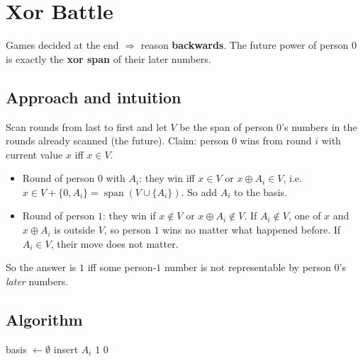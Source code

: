\section{Xor Battle}
\label{sec:b-xor-battle}


\begin{patternbox}
Games decided at the end $\Rightarrow$ reason \textbf{backwards}. The future
power of person $0$ is exactly the \textbf{xor span} of their later numbers.
\end{patternbox}

\subsection*{Approach and intuition}

Scan rounds from last to first and let $V$ be the span of person $0$'s numbers
in the rounds already scanned (the future). Claim: person $0$ wins from round
$i$ with current value $x$ iff $x\in V$.
\begin{itemize}
  \item Round of person $0$ with $A_i$: they win iff $x\in V$ or
        $x\oplus A_i\in V$, i.e.\ $x\in V+\{0,A_i\}=\operatorname{span}(V\cup\{A_i\})$.
        So add $A_i$ to the basis.
  \item Round of person $1$: they win if $x\notin V$ or $x\oplus A_i\notin V$.
        If $A_i\notin V$, one of $x$ and $x\oplus A_i$ is outside $V$, so person
        $1$ wins no matter what happened before. If $A_i\in V$, their move
        does not matter.
\end{itemize}
So the answer is $1$ iff some person-$1$ number is not representable by
person $0$'s \emph{later} numbers.

\subsection*{Algorithm}
\begin{algorithmic}[1]
\State basis $\gets\emptyset$
   insert $A_i$
   \Return $1$
  \EndIf
\EndFor
\State \Return $0$
\end{algorithmic}

